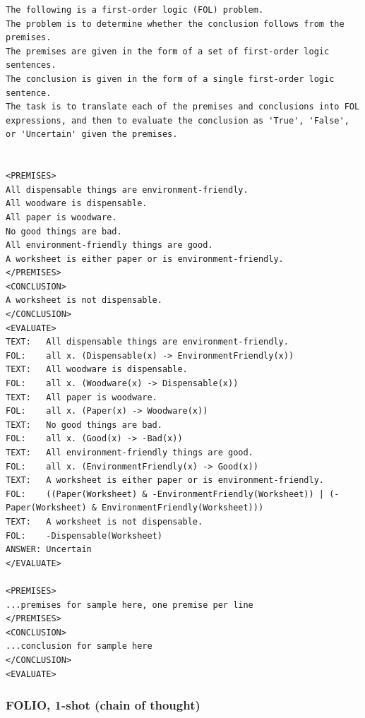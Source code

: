 \begin{lstlisting}[breaklines=true]
The following is a first-order logic (FOL) problem.
The problem is to determine whether the conclusion follows from the premises.
The premises are given in the form of a set of first-order logic sentences.
The conclusion is given in the form of a single first-order logic sentence.
The task is to translate each of the premises and conclusions into FOL expressions, and then to evaluate the conclusion as 'True', 'False', or 'Uncertain' given the premises.


<PREMISES>
All dispensable things are environment-friendly.
All woodware is dispensable.
All paper is woodware.
No good things are bad.
All environment-friendly things are good.
A worksheet is either paper or is environment-friendly.
</PREMISES>
<CONCLUSION>
A worksheet is not dispensable.
</CONCLUSION>
<EVALUATE>
TEXT:	All dispensable things are environment-friendly.
FOL:	all x. (Dispensable(x) -> EnvironmentFriendly(x))
TEXT:	All woodware is dispensable.
FOL:	all x. (Woodware(x) -> Dispensable(x))
TEXT:	All paper is woodware.
FOL:	all x. (Paper(x) -> Woodware(x))
TEXT:	No good things are bad.
FOL:	all x. (Good(x) -> -Bad(x))
TEXT:	All environment-friendly things are good.
FOL:	all x. (EnvironmentFriendly(x) -> Good(x))
TEXT:	A worksheet is either paper or is environment-friendly.
FOL:	((Paper(Worksheet) & -EnvironmentFriendly(Worksheet)) | (-Paper(Worksheet) & EnvironmentFriendly(Worksheet)))
TEXT:	A worksheet is not dispensable.
FOL:	-Dispensable(Worksheet)
ANSWER:	Uncertain
</EVALUATE>

<PREMISES>
...premises for sample here, one premise per line
</PREMISES>
<CONCLUSION>
...conclusion for sample here
</CONCLUSION>
<EVALUATE>
\end{lstlisting}

\subsubsection{FOLIO, 1-shot (chain of thought)}

